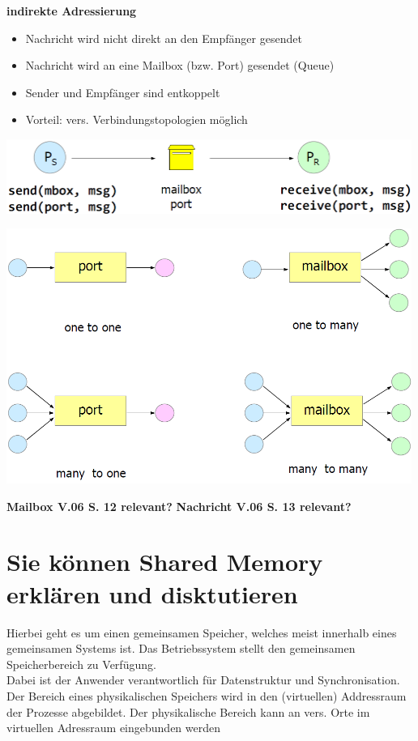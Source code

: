 \documentclass{report}
\newenvironment{Figure}
	{\par\medskip\noindent\minipage{\linewidth}}
	{\endminipage\par\medskip}
\theoremstyle{definition}
\theoremstyle{example}
\begin{document}
\textbf{indirekte Adressierung}
\begin{itemize}
	\item Nachricht wird nicht direkt an den Empfänger gesendet
	\item Nachricht wird an eine Mailbox (bzw. Port) gesendet (Queue)
	\item Sender und Empfänger sind entkoppelt
	\item Vorteil: vers. Verbindungstopologien möglich
\end{itemize}
\begin{Figure}
\centering
\includegraphics[width=500px]{img/MessagePassingIndirekteAdressierung.png}
	\label{fig:Beispiel einer indirekten Adressierung}
\end{Figure}
\begin{Figure}
\centering
\includegraphics[width=500px]{img/MessagePassingIndirekteAdressierungVar.png}
	\label{fig:Vers. Verbindungsvarianten}
\end{Figure}

\textbf{Mailbox V.06 S. 12 relevant?}
\textbf{Nachricht V.06 S. 13 relevant?}

\section{Sie können Shared Memory erklären und disktutieren}
Hierbei geht es um einen gemeinsamen Speicher, welches meist innerhalb eines gemeinsamen Systems ist. Das Betriebssystem stellt den gemeinsamen Speicherbereich zu Verfügung.\\
Dabei ist der Anwender verantwortlich für Datenstruktur und Synchronisation.\\
Der Bereich eines physikalischen Speichers wird in den (virtuellen) Addressraum der Prozesse abgebildet. Der physikalische Bereich kann an vers. Orte im virtuellen Adressraum eingebunden werden
\end{document}
